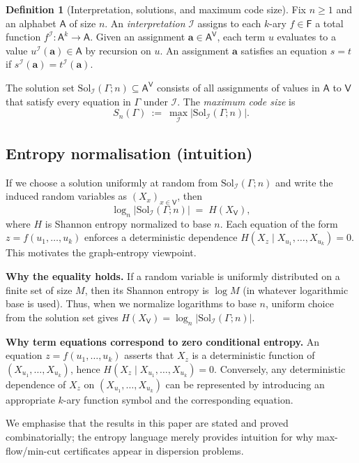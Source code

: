 \documentclass[11pt]{article}
\theoremstyle{definition}
\newtheorem{definition}{Definition}[section]
\theoremstyle{plain}
\newcommand{\A}{\mathsf{A}}
\newcommand{\Vars}{\mathsf{V}}
\newcommand{\Fun}{\mathsf{F}}
\newcommand{\Sol}{\mathrm{Sol}}
\newcommand{\Sn}{S_n}
\begin{document}
\begin{definition}[Interpretation, solutions, and maximum code size]
Fix $n\ge 1$ and an alphabet $\A$ of size $n$.
An \emph{interpretation} $\mathcal I$ assigns to each $k$-ary $f\in\Fun$ a total function
$f^\mathcal I:\A^k\to\A$.
Given an assignment $\mathbf a\in\A^{\Vars}$, each term $u$ evaluates to a value
$u^{\mathcal I}(\mathbf a)\in\A$ by recursion on $u$.
An assignment $\mathbf a$ satisfies an equation $s=t$ if $s^{\mathcal I}(\mathbf a)=t^{\mathcal I}(\mathbf a)$.

The solution set $\Sol_\mathcal I(\Gamma;n)\subseteq \A^{\Vars}$ consists of all assignments of values in
$\A$ to $\Vars$ that satisfy every equation in $\Gamma$ under $\mathcal I$.
The \emph{maximum code size} is
\[
\Sn(\Gamma)\ :=\ \max_{\mathcal I} |\Sol_\mathcal I(\Gamma;n)|.
\]
\end{definition}

\subsection{Entropy normalisation (intuition)}
If we choose a solution uniformly at random from $\Sol_\mathcal I(\Gamma;n)$ and write the induced random
variables as $(X_x)_{x\in\Vars}$, then
\[
\log_n |\Sol_\mathcal I(\Gamma;n)| \;=\; H(X_{\Vars}),
\]
where $H$ is Shannon entropy normalized to base $n$.
Each equation of the form $z=f(u_1,\dots,u_k)$ enforces a deterministic dependence
$H(X_z\mid X_{u_1},\dots,X_{u_k})=0$.
This motivates the graph-entropy viewpoint.

\smallskip
\noindent
\textbf{Why the equality holds.}
If a random variable is uniformly distributed on a finite set of size $M$, then its Shannon entropy is $\log M$
(in whatever logarithmic base is used).
Thus, when we normalize logarithms to base $n$, uniform choice from the solution set gives
$H(X_{\Vars})=\log_n|\Sol_\mathcal I(\Gamma;n)|$.

\smallskip
\noindent
\textbf{Why term equations correspond to zero conditional entropy.}
An equation $z=f(u_1,\dots,u_k)$ asserts that $X_z$ is a deterministic function of $(X_{u_1},\dots,X_{u_k})$,
hence $H(X_z\mid X_{u_1},\dots,X_{u_k})=0$.
Conversely, any deterministic dependence of $X_z$ on $(X_{u_1},\dots,X_{u_k})$ can be represented by introducing an
appropriate $k$-ary function symbol and the corresponding equation.

\smallskip
\noindent
We emphasise that the results in this paper are stated and proved combinatorially; the entropy language merely
provides intuition for why max-flow/min-cut certificates appear in dispersion problems.
\end{document}
